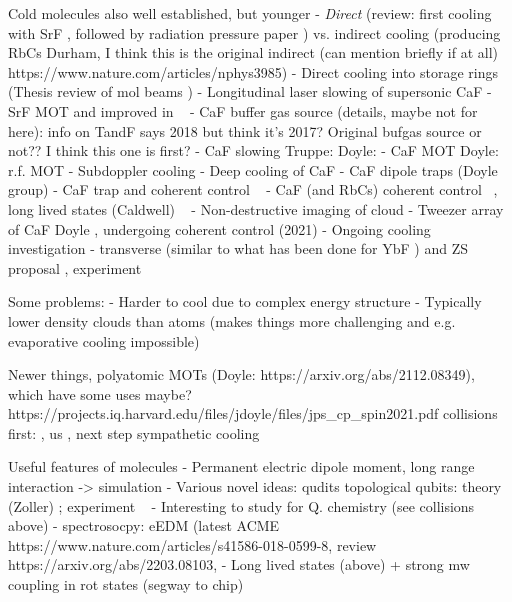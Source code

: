Cold molecules also well established, but younger
- \emph{Direct} (review: \cite{Tarbutt2018} first cooling with SrF \cite{Shuman2009}, followed by
radiation pressure paper \cite{PhysRevLett.108.103002}) vs. indirect cooling
(producing RbCs Durham, I think this is the original indirect (can mention briefly if at all) \cite{PhysRevA.89.033604}
https://www.nature.com/articles/nphys3985)
- Direct cooling into storage rings (Thesis \cite{Crompvoets2005} review of mol beams \cite{vandeMeerakker2012})
- Longitudinal laser slowing of supersonic CaF \cite{PhysRevA.89.053416}
- SrF MOT \cite{Barry2014} and improved in ~\cite{PhysRevLett.116.063004}
- CaF buffer gas source (details, maybe not for here): \cite{Truppe2018} %
info on TandF says 2018 but think it's 2017? Original bufgas source
\cite{Barry2011} or not?? I think this one is first? \cite{Maxwell2005}
- CaF slowing Truppe: \cite{Truppe2017a} Doyle: \cite{0953-4075-49-17-174001}
- CaF MOT Doyle: r.f. MOT \cite{PhysRevLett.119.103201}
- Subdoppler cooling \cite{Truppe2017}
- Deep cooling of CaF \cite{PhysRevLett.123.033202}
- CaF dipole traps (Doyle group)
- CaF trap and coherent control ~\cite{WilliamsMagnetic2018}
- CaF (and RbCs) coherent control ~\cite{Blackmore_2018}, long lived states
(Caldwell) ~\cite{PhysRevLett.124.063001}
- Non-destructive imaging of cloud \cite{PhysRevLett.121.083201}
- Tweezer array of CaF Doyle \cite{Anderegg2019}, undergoing coherent control
\cite{PhysRevLett.127.123202} (2021)
- Ongoing cooling investigation - transverse (similar to what has been done for
YbF \cite{Alauze2021}) and ZS proposal \cite{Fitch2016}, experiment \cite{PhysRevLett.127.263002}

Some problems:
- Harder to cool due to complex energy structure
- Typically lower density clouds than atoms (makes things more challenging and
e.g. evaporative cooling impossible)

Newer things, polyatomic MOTs (Doyle: https://arxiv.org/abs/2112.08349),
which have some uses maybe? https://projects.iq.harvard.edu/files/jdoyle/files/jps_cp_spin2021.pdf
collisions first: \cite{son2019collisional}, us \cite{Jurgilas2021, JurgilasPRL_2021}, next step sympathetic cooling

Useful features of molecules
- Permanent electric dipole moment, long range interaction -> simulation
- Various novel ideas:
   qudits \cite{Sawant_2020}
   topological qubits: theory (Zoller) \cite{Micheli2006};  experiment ~\cite{Gross995}
- Interesting to study for Q. chemistry (see collisions above)
- spectrosocpy: eEDM
(latest ACME https://www.nature.com/articles/s41586-018-0599-8,
review https://arxiv.org/abs/2203.08103, 
- Long lived states (above) + strong mw coupling in rot states (segway to chip)


